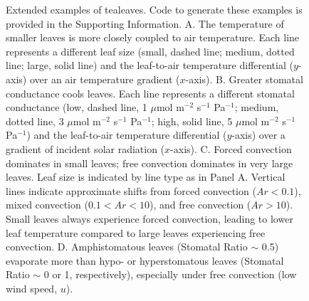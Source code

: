\documentclass[11pt, oneside]{article}
\newcommand{\pkg}[1]{{\fontseries{b}\selectfont #1}}
\newcommand{\tealeaves}{\pkg{tealeaves}}
\begin{document}
\begin{figure}[t!]
\caption{Extended examples of \tealeaves. Code to generate these examples is provided in the Supporting Information. A. The temperature of smaller leaves is more closely coupled to air temperature. Each line represents a different leaf size (small, dashed line; medium, dotted line; large, solid line) and the leaf-to-air temperature differential ($y$-axis) over an air temperature gradient ($x$-axis). B. Greater stomatal conductance cools leaves. Each line represents a different stomatal conductance (low, dashed line, 1 $\mu$mol m$^{-2}$ s$^{-1}$ Pa$^{-1}$; medium, dotted line, 3 $\mu$mol m$^{-2}$ s$^{-1}$ Pa$^{-1}$; high, solid line, 5 $\mu$mol m$^{-2}$ s$^{-1}$ Pa$^{-1}$) and the leaf-to-air temperature differential ($y$-axis) over a gradient of incident solar radiation ($x$-axis). C. Forced convection dominates in small leaves; free convection dominates in very large leaves. Leaf size is indicated by line type as in Panel A. Vertical lines indicate approximate shifts from forced convection ($\mathit{Ar} < 0.1$), mixed convection ($0.1 < \mathit{Ar} < 10$), and free convection ($\mathit{Ar} > 10$). Small leaves always experience forced convection, leading to lower leaf temperature compared to large leaves experiencing free convection. D. Amphistomatous leaves (Stomatal Ratio $\sim$ 0.5) evaporate more than hypo- or hyperstomatous leaves (Stomatal Ratio $\sim$ 0 or 1, respectively), especially under free convection (low wind speed, $u$).}
\label{fig:fig2}
\end{figure}

\clearpage

\end{document}
